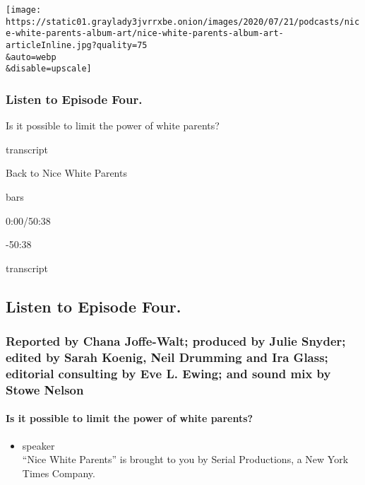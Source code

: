 \texttt{[image: https://static01.graylady3jvrrxbe.onion/images/2020/07/21/podcasts/nice-white-parents-album-art/nice-white-parents-album-art-articleInline.jpg?quality=75\\\&auto=webp\\\&disable=upscale]}

\hypertarget{listen-to-episode-four}{%
\subsubsection{Listen to Episode Four.}\label{listen-to-episode-four}}

Is it possible to limit the power of white parents?

transcript

Back to Nice White Parents

bars

0:00/50:38

-50:38

transcript

\hypertarget{listen-to-episode-four-1}{%
\subsection{Listen to Episode Four.}\label{listen-to-episode-four-1}}

\hypertarget{reported-by-chana-joffe-walt-produced-by-julie-snyder-edited-by-sarah-koenig-neil-drumming-and-ira-glass-editorial-consulting-by-eve-l-ewing-and-sound-mix-by-stowe-nelson}{%
\subsubsection{Reported by Chana Joffe-Walt; produced by Julie Snyder;
edited by Sarah Koenig, Neil Drumming and Ira Glass; editorial
consulting by Eve L. Ewing; and sound mix by Stowe
Nelson}\label{reported-by-chana-joffe-walt-produced-by-julie-snyder-edited-by-sarah-koenig-neil-drumming-and-ira-glass-editorial-consulting-by-eve-l-ewing-and-sound-mix-by-stowe-nelson}}

\hypertarget{is-it-possible-to-limit-the-power-of-white-parents}{%
\paragraph{Is it possible to limit the power of white
parents?}\label{is-it-possible-to-limit-the-power-of-white-parents}}

\begin{itemize}
\tightlist
\item
  speaker\\
  ``Nice White Parents'' is brought to you by Serial Productions, a New
  York Times Company.
\end{itemize}

